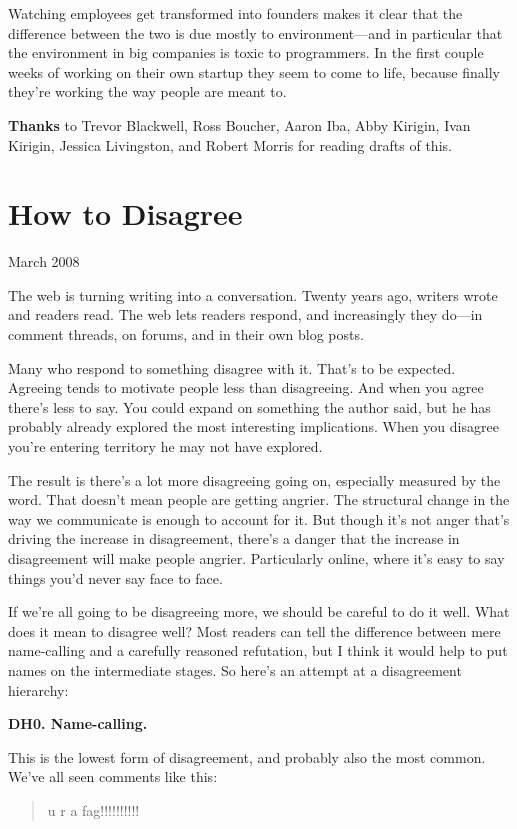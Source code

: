 \documentclass[12pt]{book}
\begin{document}
Watching employees get transformed into founders makes it clear that the
difference between the two is due mostly to environment---and in
particular that the environment in big companies is toxic to
programmers. In the first couple weeks of working on their own startup
they seem to come to life, because finally they're working the way
people are meant to.


\textbf{Thanks} to Trevor Blackwell, Ross Boucher, Aaron Iba, Abby
Kirigin, Ivan Kirigin, Jessica Livingston, and Robert Morris for reading
drafts of this.
\chapter{How to Disagree}

March 2008

The web is turning writing into a conversation. Twenty years ago,
writers wrote and readers read. The web lets readers respond, and
increasingly they do---in comment threads, on forums, and in their own
blog posts.

Many who respond to something disagree with it. That's to be expected.
Agreeing tends to motivate people less than disagreeing. And when you
agree there's less to say. You could expand on something the author
said, but he has probably already explored the most interesting
implications. When you disagree you're entering territory he may not
have explored.

The result is there's a lot more disagreeing going on, especially
measured by the word. That doesn't mean people are getting angrier. The
structural change in the way we communicate is enough to account for it.
But though it's not anger that's driving the increase in disagreement,
there's a danger that the increase in disagreement will make people
angrier. Particularly online, where it's easy to say things you'd never
say face to face.

If we're all going to be disagreeing more, we should be careful to do it
well. What does it mean to disagree well? Most readers can tell the
difference between mere name-calling and a carefully reasoned
refutation, but I think it would help to put names on the intermediate
stages. So here's an attempt at a disagreement hierarchy:

\textbf{DH0. Name-calling.}

This is the lowest form of disagreement, and probably also the most
common. We've all seen comments like this:

\begin{quote}
u r a fag!!!!!!!!!!
\end{quote}
\end{document}
